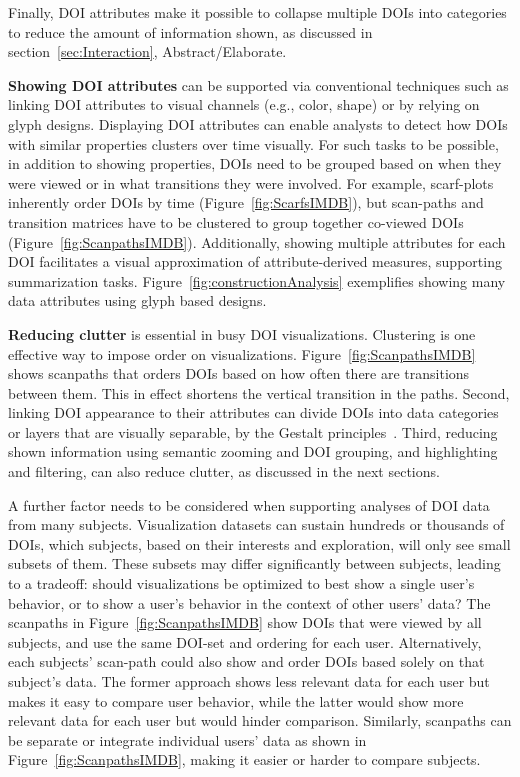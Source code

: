 Finally, DOI attributes make it possible to collapse multiple DOIs into categories to reduce the amount of information shown, as discussed in section~\ref{sec:Interaction}, Abstract/Elaborate.


\textbf{Showing DOI attributes} can be supported via conventional techniques such as linking DOI attributes to visual channels (e.g., color, shape) or by relying on glyph designs. Displaying DOI attributes can enable analysts to detect how DOIs with similar properties clusters over time visually. For such tasks to be possible, in addition to showing properties, DOIs need to be grouped based on when they were viewed or in what transitions they were involved. For example, scarf-plots inherently order DOIs by time (Figure~\ref{fig:ScarfsIMDB}), but scan-paths and transition matrices have to be clustered to group together co-viewed DOIs (Figure~\ref{fig:ScanpathsIMDB}). Additionally, showing multiple attributes for each DOI facilitates a visual approximation of attribute-derived measures, supporting summarization tasks. Figure~\ref{fig:constructionAnalysis} exemplifies showing many data attributes using glyph based designs. 


\textbf{Reducing clutter} is essential in busy DOI visualizations. Clustering is one effective way to impose order on visualizations. Figure~\ref{fig:ScanpathsIMDB} shows scanpaths that orders DOIs based on how often there are transitions between them. This in effect shortens the vertical transition in the paths. Second, linking DOI appearance to their attributes can divide DOIs into data categories or layers that are visually separable, by the Gestalt principles~\cite{kohler1970gestalt}. Third, reducing shown information using semantic zooming and DOI grouping, and highlighting and filtering, can also reduce clutter, as discussed in the next sections. 

A further factor needs to be considered when supporting analyses of DOI data from many subjects. Visualization datasets can sustain hundreds or thousands of DOIs, which subjects, based on their interests and exploration, will only see small subsets of them. These subsets may differ significantly between subjects, leading to a tradeoff: should visualizations be optimized to best show a single user's behavior, or to show a user's behavior in the context of other users' data? The scanpaths in Figure~\ref{fig:ScanpathsIMDB} show DOIs that were viewed by all subjects, and use the same DOI-set and ordering for each user. Alternatively, each subjects' scan-path could also show and order DOIs based solely on that subject's data. The former approach shows less relevant data for each user but makes it easy to compare user behavior, while the latter would show more relevant data for each user but would hinder comparison. Similarly, scanpaths can be separate or integrate individual users' data as shown in Figure~\ref{fig:ScanpathsIMDB}, making it easier or harder to compare subjects.

